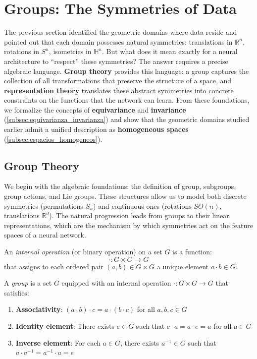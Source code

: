 \section{Groups: The Symmetries of Data}\label{sec:grupos_simetrias}

The previous section identified the geometric domains where data reside and pointed out that each domain possesses natural symmetries: translations in $\mathbb{R}^n$, rotations in $S^n$, isometries in $\mathbb{H}^n$. But what does it mean exactly for a neural architecture to ``respect'' these symmetries? The answer requires a precise algebraic language. \textbf{Group theory} provides this language: a group captures the collection of all transformations that preserve the structure of a space, and \textbf{representation theory} translates these abstract symmetries into concrete constraints on the functions that the network can learn. From these foundations, we formalize the concepts of \textbf{equivariance} and \textbf{invariance} (\autoref{subsec:equivarianza_invarianza}) and show that the geometric domains studied earlier admit a unified description as \textbf{homogeneous spaces} (\autoref{subsec:espacios_homogeneos}).

\subsection{Group Theory}\label{subsec:teoria_grupos_representaciones}

We begin with the algebraic foundations: the definition of group, subgroups, group actions, and Lie groups. These structures allow us to model both discrete symmetries (permutations $S_n$) and continuous ones (rotations $SO(n)$, translations $\mathbb{R}^d$). The natural progression leads from groups to their linear representations, which are the mechanism by which symmetries act on the feature spaces of a neural network.

\begin{definition}\label{def:operacion_interna}
An \textit{internal operation} (or binary operation) on a set $G$ is a function:
\begin{equation}
\cdot: G \times G \rightarrow G
\end{equation}
that assigns to each ordered pair $(a,b) \in G \times G$ a unique element $a \cdot b \in G$.
\end{definition}

\begin{definition}[Group]\label{def:grupo}
A \textit{group} is a set $G$ equipped with an internal operation $\cdot: G \times G \rightarrow G$ that satisfies:
\begin{enumerate}
    \item \textbf{Associativity}: $(a \cdot b) \cdot c = a \cdot (b \cdot c)$ for all $a, b, c \in G$
    \item \textbf{Identity element}: There exists $e \in G$ such that $e \cdot a = a \cdot e = a$ for all $a \in G$
    \item \textbf{Inverse element}: For each $a \in G$, there exists $a^{-1} \in G$ such that $a \cdot a^{-1} = a^{-1} \cdot a = e$
\end{enumerate}
\end{definition}

